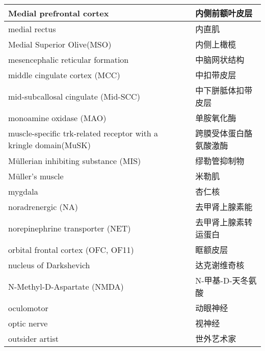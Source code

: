 \begin{longtable}{lll}
	\midrule
	Medial prefrontal cortex    && 内侧前额叶皮层  \\
	
	\midrule
	medial rectus    && 内直肌  \\
	
	\midrule
	Medial Superior Olive(MSO)   && 内侧上橄榄  \\
	
	\midrule
	mesencephalic reticular formation   && 中脑网状结构  \\
	
	\midrule
	middle cingulate cortex (MCC)   && 中扣带皮层  \\
	
	\midrule
	mid-subcallosal cingulate (Mid-SCC)  && 中下胼胝体扣带皮层  \\
	
	\midrule
	monoamine oxidase (MAO)   && 单胺氧化酶  \\
	
	\midrule
	muscle-specific trk-related receptor with a
	kringle domain(MuSK)   && 跨膜受体蛋白酪氨酸激酶  \\
	
	\midrule
	Müllerian inhibiting substance (MIS)   && 缪勒管抑制物  \\
	
	\midrule
	Müller's muscle   && 米勒肌  \\
	
	\midrule
	mygdala     && 杏仁核   \\
	
	\midrule
	noradrenergic (NA)   && 去甲肾上腺素能 \\
	
	\midrule
	norepinephrine transporter (NET)   && 去甲肾上腺素转运蛋白 \\
	
	\midrule
	orbital frontal cortex (OFC, OF11)   && 眶额皮层 \\
	
	\midrule
	nucleus of Darkshevich   && 达克谢维奇核  \\
	
	\midrule
	N-Methyl-D-Aspartate (NMDA)   && N-甲基-D-天冬氨酸  \\
	
	\midrule
	oculomotor     && 动眼神经   \\
	
	\midrule
	optic nerve     && 视神经   \\
	
	\midrule
	outsider artist     && 世外艺术家   \\
	

\end{longtable}
